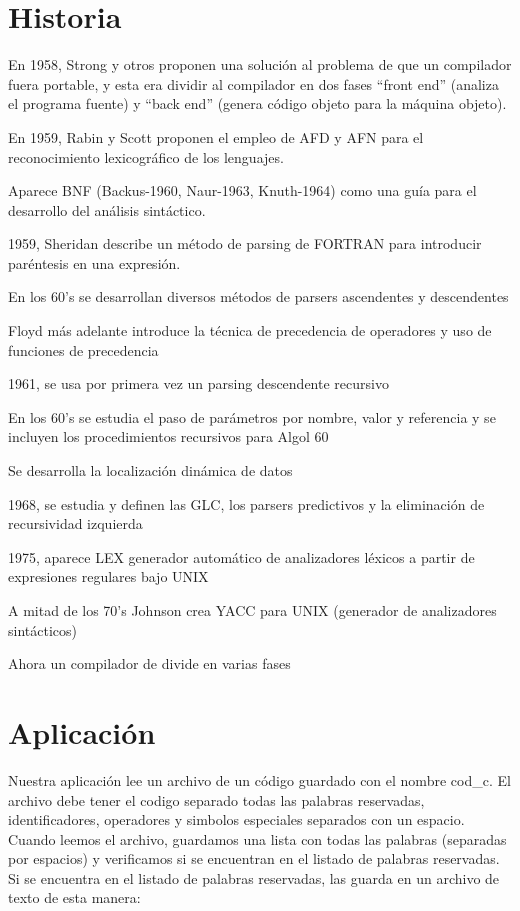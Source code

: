 \documentclass[12pt,oneside]{book}
\begin{document}
\chapter{Historia}
En 1958, Strong y otros proponen una solución al problema de que un compilador fuera portable, y esta era dividir al compilador en dos fases “front end” (analiza el programa fuente) y “back end” (genera código objeto para la máquina objeto).

En 1959, Rabin y Scott proponen el empleo de AFD y AFN para el reconocimiento lexicográfico de los lenguajes.

Aparece BNF (Backus-1960, Naur-1963, Knuth-1964) como una guía para el desarrollo del análisis sintáctico.

1959, Sheridan describe un método de parsing de FORTRAN para introducir paréntesis en una expresión.

En los 60’s se desarrollan diversos métodos de parsers ascendentes y descendentes

Floyd más adelante introduce la técnica de precedencia de operadores y uso de funciones de precedencia

1961, se usa por primera vez un parsing descendente recursivo

En los 60’s se estudia el paso de parámetros por nombre, valor y referencia y se incluyen los procedimientos recursivos para Algol 60

Se desarrolla la localización dinámica de datos

1968, se estudia y definen las GLC, los parsers predictivos y la eliminación de recursividad izquierda

1975, aparece LEX generador automático de analizadores léxicos a partir de expresiones regulares bajo UNIX

A mitad de los 70’s Johnson crea YACC para UNIX (generador de analizadores sintácticos)

Ahora un compilador de divide en varias fases

\chapter{Aplicación}
	
	Nuestra aplicación lee un archivo de un código guardado con el nombre cod\_c. El archivo debe tener el codigo separado todas las palabras reservadas, identificadores, operadores y simbolos especiales separados con un espacio. Cuando leemos el archivo, guardamos una lista con todas las palabras (separadas por espacios) y verificamos si se encuentran en el listado de palabras reservadas. Si se encuentra en el listado de palabras reservadas, las guarda en un archivo de texto de esta manera:
\end{document}
